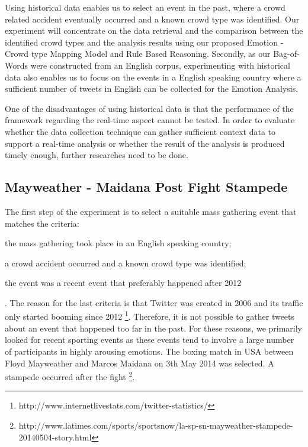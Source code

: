 Using historical data enables us to select an event in the past, where a crowd related accident eventually occurred and a known crowd type was identified. Our experiment will concentrate on the data retrieval and the comparison between the identified crowd types and the analysis results using our proposed Emotion - Crowd type Mapping Model and Rule Based Reasoning. Secondly, as our Bag-of-Words were constructed from an English corpus, experimenting with historical data also enables us to focus on the events in a English speaking country where a sufficient number of tweets in English can be collected for the Emotion Analysis.

One of the disadvantages of using historical data is that the performance of the framework regarding the real-time aspect cannot be tested. In order to evaluate whether the data collection technique can gather sufficient context data to support a real-time analysis or whether the result of the analysis is produced timely enough, further researches need to be done.

\subsection{Mayweather - Maidana Post Fight Stampede}

The first step of the experiment is to select a suitable mass gathering event that matches the criteria:
\begin{inparaenum}[i)]
\item the mass gathering took place in an English speaking country;
\item a crowd accident occurred and a known crowd type was identified;
\item the event was a recent event that preferably happened after 2012
\end{inparaenum}. The reason for the last criteria is that Twitter was created in 2006 and its traffic only started booming since 2012 \footnote{http://www.internetlivestats.com/twitter-statistics/}. Therefore, it is not possible to gather tweets about an event that happened too far in the past. For these reasons, we primarily looked for recent sporting events as these events tend to involve a large number of participants in highly arousing emotions. The boxing match in USA between Floyd Mayweather and Marcos Maidana on 3th May 2014 was selected. A stampede occurred after the fight \footnote{http://www.latimes.com/sports/sportsnow/la-sp-sn-mayweather-stampede-20140504-story.html}. 

